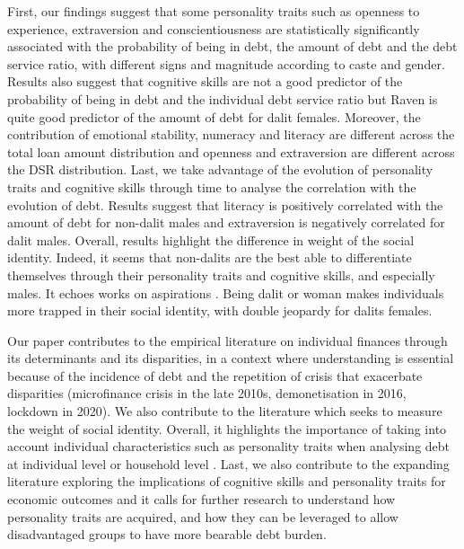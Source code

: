 \documentclass[a4paper, 12pt, onecolumn]{article}
\begin{document}
First, our findings suggest that some personality traits such as openness to experience, extraversion and conscientiousness are statistically significantly associated with the probability of being in debt, the amount of debt and the debt service ratio, with different signs and magnitude according to caste and gender. 
Results also suggest that cognitive skills are not a good predictor of the probability of being in debt and the individual debt service ratio but Raven is quite good predictor of the amount of debt for dalit females.
Moreover, the contribution of emotional stability, numeracy and literacy are different across the total loan amount distribution and openness and extraversion are different across the DSR distribution.
Last, we take advantage of the evolution of personality traits and cognitive skills through time to analyse the correlation with the evolution of debt.
Results suggest that literacy is positively correlated with the amount of debt for non-dalit males and extraversion is negatively correlated for dalit males.
Overall, results highlight the difference in weight of the social identity.
Indeed, it seems that non-dalits are the best able to differentiate themselves through their personality traits and cognitive skills, and especially males.
It echoes works on aspirations \citep{Mukherjee2017, Sarkar2020}.
Being dalit or woman makes individuals more trapped in their social identity, with double jeopardy for dalits females.

Our paper contributes to the empirical literature on individual finances through its determinants and its disparities, in a context where understanding is essential because of the incidence of debt and the repetition of crisis that exacerbate disparities (microfinance crisis in the late 2010s, demonetisation in 2016, lockdown in 2020).
We also contribute to the literature which seeks to measure the weight of social identity.
Overall, it highlights the importance of taking into account individual characteristics such as personality traits when analysing debt at individual level or household level \citep{Brown2014}.
Last, we also contribute to the expanding literature exploring the implications of cognitive skills and personality traits for economic outcomes and it calls for further research to understand how personality traits are acquired, and how they can be leveraged to allow disadvantaged groups to have more bearable debt burden.




\clearpage
\newpage
%

\end{document}
